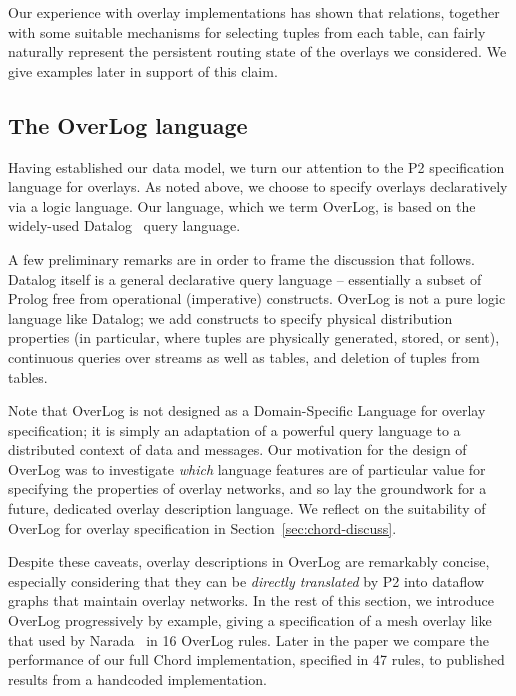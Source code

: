 \documentclass{sig-alt-full}
\def\Sys{P2\xspace}
\def\Lang{OverLog\xspace}
\def\PChordLines{47\xspace}
\def\PNaradaLines{16\xspace}
\begin{document}
Our experience with overlay implementations has shown that relations,
together with some suitable mechanisms for selecting tuples from each
table, can fairly naturally represent the persistent routing state of
the overlays we considered.  We give examples later in
support of this claim.


\subsection{The \Lang language}
\label{sec:overlog}
Having established our data model, we turn our attention to the \Sys
specification language for overlays.  As noted above, we choose to
specify overlays declaratively via a logic language.  Our language,
which we term \Lang, is based on the widely-used
Datalog~\cite{alicebook} query language.

A few preliminary remarks are in order to frame the discussion that
follows.  Datalog itself is a general declarative query language --
essentially a subset of Prolog free from operational (imperative) constructs.
\Lang is not a pure logic language like Datalog; we add constructs to
specify physical distribution properties (in particular, where tuples
are physically generated, stored, or sent), continuous queries over
streams as well as tables, and deletion of tuples from tables. 

Note that \Lang is not designed as a Domain-Specific Language for
overlay specification; it is simply an adaptation of a powerful query
language to a distributed context of data and messages.  Our 
motivation for the design of \Lang was to investigate \emph{which}
language features are of particular value for specifying the
properties of overlay networks, and so lay the groundwork for a
future, dedicated overlay description language.  We reflect on the
suitability of \Lang for overlay specification in
Section~\ref{sec:chord-discuss}.

Despite these caveats, overlay
descriptions in \Lang are remarkably concise, especially considering that they
can be \textit{directly translated} by \Sys into dataflow graphs that 
maintain overlay networks.  In the rest of this section, we
introduce \Lang progressively by example, giving a specification of a
mesh overlay like that used by Narada~\cite{chu00case} in
\PNaradaLines \Lang rules.  Later in the paper we compare the
performance of our full Chord implementation, specified in \PChordLines
rules, to published results from a handcoded implementation.   
\end{document}

